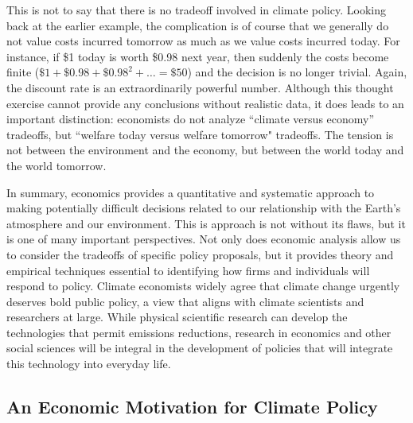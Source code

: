 This is not to say that there is no tradeoff involved in climate policy. Looking back at the earlier example, the complication is of course that we generally do not value costs incurred tomorrow as much as we value costs incurred today. For instance, if \$1 today is worth \$0.98 next year, then suddenly the costs become finite ($\$1  + \$0.98  + \$0.98^2 + \ldots = \$50$) and the decision is no longer trivial. Again, the discount rate is an extraordinarily powerful number. Although this thought exercise cannot provide any conclusions without realistic data, it does leads to an important distinction: economists do not analyze ``climate versus economy'' tradeoffs, but ``welfare today versus welfare tomorrow" tradeoffs. The tension is not between the environment and the economy, but between the world today and the world tomorrow. 

In summary, economics provides a quantitative and systematic approach to making potentially difficult decisions related to our relationship with the Earth's atmosphere and our environment. This is approach is not without its flaws, but it is one of many important perspectives. Not only does economic analysis allow us to consider the tradeoffs of specific policy proposals, but it provides theory and empirical techniques essential to identifying how firms and individuals will respond to policy. Climate economists widely agree that climate change urgently deserves bold public policy, a view that aligns with climate scientists and researchers at large. While physical scientific research can develop the technologies that permit emissions reductions, research in economics and other social sciences will be integral in the development of policies that will integrate this technology into everyday life.




\subsection{An Economic Motivation for Climate Policy \label{2.2}}

